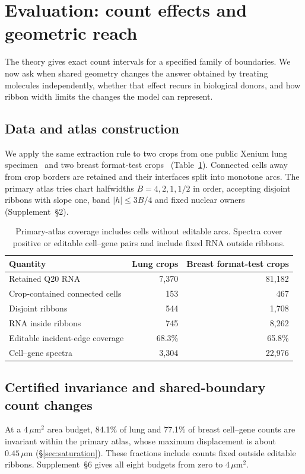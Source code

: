\documentclass[10pt,letterpaper]{article}
\begin{document}
\section{Evaluation: count effects and geometric reach}\label{sec:eval}
The theory gives exact count intervals for a specified family of boundaries. We now ask when shared geometry changes the answer obtained by treating molecules independently, whether that effect recurs in biological donors, and how ribbon width limits the changes the model can represent.
\subsection{Data and atlas construction}
We apply the same extraction rule to two crops from one public Xenium lung specimen~\cite{data,xenium} and two breast format-test crops~\cite{breasttest} (Table~\ref{tab:scope}). Connected cells away from crop borders are retained and their interfaces split into monotone arcs. The primary atlas tries chart halfwidths $B=4,2,1,1/2$ in order, accepting disjoint ribbons with slope one, band $|h|\le3B/4$ and fixed nuclear owners (Supplement~\S2).

\begin{table}[!htbp]\centering
\begin{tabular}{lrr}\toprule
Quantity&Lung crops&Breast format-test crops\\\midrule
Retained Q20 RNA&7,370&81,182\\
Crop-contained connected cells&153&467\\
Disjoint ribbons&544&1,708\\
RNA inside ribbons&745&8,262\\
Editable incident-edge coverage&68.3\%&65.8\%\\
Cell--gene spectra&3,304&22,976\\
\bottomrule
\end{tabular}
\caption{Primary-atlas coverage includes cells without editable arcs. Spectra cover positive or editable cell--gene pairs and include fixed RNA outside ribbons.}\label{tab:scope}
\end{table}

\FloatBarrier
\subsection{Certified invariance and shared-boundary count changes}\label{sec:effects}
At a $4\,\mu\mathrm m^2$ area budget, 84.1\% of lung and 77.1\% of breast cell--gene counts are invariant within the primary atlas, whose maximum displacement is about $0.45\,\mu\mathrm m$ (\S\ref{sec:saturation}). These fractions include counts fixed outside editable ribbons. Supplement~\S6 gives all eight budgets from zero to $4\,\mu\mathrm m^2$.
\end{document}
